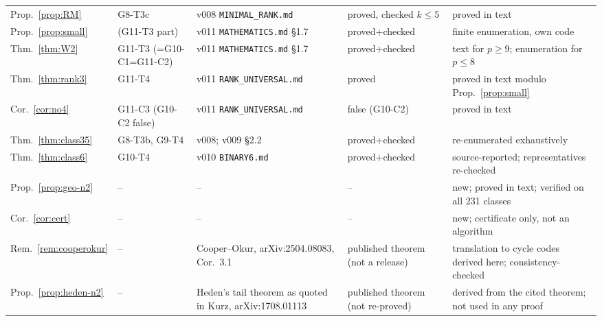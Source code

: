 \begin{longtable}{@{}p{2.6cm}p{2.0cm}p{3.4cm}p{2.0cm}p{3.6cm}@{}}
Prop.~\ref{prop:RM} & G8-T3c & v008 \texttt{MINIMAL\_RANK.md} & proved, checked $k\le5$ & proved in text\\
Prop.~\ref{prop:small} & (G11-T3 part) & v011 \texttt{MATHEMATICS.md} \S1.7 & proved+checked & finite enumeration, own code\\
Thm.~\ref{thm:W2} & G11-T3 (=G10-C1=G11-C2) & v011 \texttt{MATHEMATICS.md} \S1.7 & proved+checked & text for $p\ge9$; enumeration for $p\le8$\\
Thm.~\ref{thm:rank3} & G11-T4 & v011 \texttt{RANK\_UNIVERSAL.md} & proved & proved in text modulo Prop.~\ref{prop:small}\\
Cor.~\ref{cor:no4} & G11-C3 (G10-C2 false) & v011 \texttt{RANK\_UNIVERSAL.md} & false (G10-C2) & proved in text\\
Thm.~\ref{thm:class35} & G8-T3b, G9-T4 & v008; v009 \S2.2 & proved+checked & re-enumerated exhaustively\\
Thm.~\ref{thm:class6} & G10-T4 & v010 \texttt{BINARY6.md} & proved+checked & source-reported; representatives re-checked\\
Prop.~\ref{prop:geo-n2} & -- & -- & -- & new; proved in text; verified on all 231 classes\\
Cor.~\ref{cor:cert} & -- & -- & -- & new; certificate only, not an algorithm\\
Rem.~\ref{rem:cooperokur} & -- & Cooper--Okur, arXiv:2504.08083, Cor.~3.1 & published theorem (not a release) & translation to cycle codes derived here; consistency-checked\\
Prop.~\ref{prop:heden-n2} & -- & Heden's tail theorem as quoted in Kurz, arXiv:1708.01113 & published theorem (not re-proved) & derived from the cited theorem; not used in any proof\\\bottomrule
\end{longtable}
\endgroup
